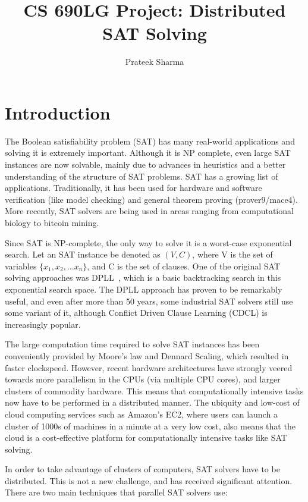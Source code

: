 \documentclass{article}
\title{CS 690LG Project: Distributed SAT Solving}
\author{Prateek Sharma}
\begin{document}
\maketitle
\section{Introduction}

The Boolean satisfiability problem (SAT) has many real-world
applications and solving it is extremely important. Although it is NP
complete, even large SAT instances are now solvable, mainly due to
advances in heuristics and a better understanding of the structure of
SAT problems. SAT has a growing list of applications. Traditionally,
it has been used for hardware and software verification (like model
checking) and general theorem proving (prover9/mace4). More recently,
SAT solvers are being used in areas ranging from computational biology
to bitcoin mining.


Since SAT is NP-complete, the only way to solve it is a worst-case
exponential search. Let an SAT instance be denoted as $(V,C)$, where V
is the set of variables $\{x_1,x_2,\ldots x_n \}$, and C is the set of
clauses. One of the original SAT solving approaches was
DPLL~\cite{knuth}, which is a basic backtracking search in this
exponential search space. The DPLL approach has proven to be
remarkably useful, and even after more than 50 years, some industrial
SAT solvers still use some variant of it, although Conflict Driven
Clause Learning (CDCL) is increasingly popular.


The large computation time required to solve SAT instances has been
conveniently provided by Moore's law and Dennard Scaling, which
resulted in faster clockspeed. However, recent hardware architectures
have strongly veered towards more parallelism in the CPUs (via
multiple CPU cores), and larger clusters of commodity hardware. This
means that computationally intensive tasks now have to be performed in
a distributed manner. The ubiquity and low-cost of cloud computing
services such as Amazon's EC2, where users can launch a cluster of
1000s of machines in a minute at a very low cost, also means that the
cloud is a cost-effective platform for computationally intensive tasks
like SAT solving.


In order to take advantage of clusters of computers, SAT solvers have
to be distributed. This is not a new challenge, and has received
significant attention. There are two main techniques that parallel SAT
solvers use:
\end{document}
